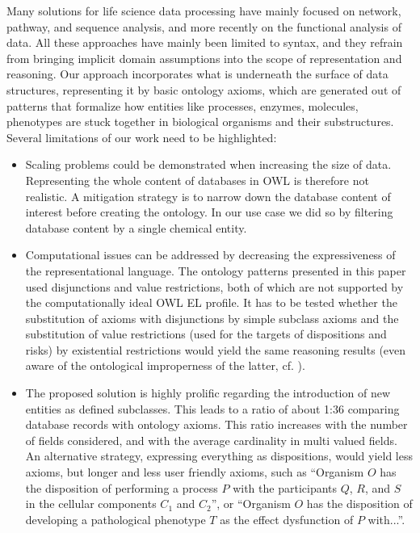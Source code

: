 Many solutions for life science data processing have mainly focused on network, pathway, and sequence analysis, and more recently on the functional analysis of data. All these approaches have mainly been limited to syntax, and they refrain from bringing implicit domain assumptions into the scope of representation and reasoning. Our approach incorporates what is underneath the surface of data structures, representing it by basic ontology axioms, which are generated out of patterns that formalize how entities like processes, enzymes, molecules, phenotypes are stuck together in biological organisms and their substructures.   
Several limitations of our work need to be highlighted: 

\begin{itemize}
	\item Scaling problems could be demonstrated when increasing the size of data. Representing the whole content of databases in OWL is therefore not realistic. A mitigation strategy is to narrow down the database content of interest before creating the ontology. In our use case we did so by filtering database content by a single chemical entity.  
	\item Computational issues can be addressed by decreasing the expressiveness of the representational language. The ontology patterns presented in this paper used disjunctions and value restrictions, both of which are not supported by the computationally ideal OWL EL profile. It has to be tested whether the substitution of axioms with disjunctions by simple subclass axioms and the substitution of value restrictions (used for the targets of dispositions and risks) by existential restrictions would yield the same reasoning results (even aware of the ontological improperness of the latter, cf. \cite{Schulz2014}).
	\item
	The proposed solution is highly prolific regarding the introduction of new entities as defined subclasses. This leads to a ratio of about 1:36 comparing database records with ontology axioms. This ratio increases with the number of fields considered, and with the average cardinality in multi valued fields. An alternative strategy, expressing everything as dispositions, would yield less axioms, but longer and less user friendly axioms, such as ``Organism $O$ has the disposition of performing a process $P$ with the participants $Q$, $R$, and $S$ in the cellular components $C_1$ and $C_2$'', or ``Organism $O$ has the disposition of developing a pathological phenotype $T$ as the effect dysfunction of $P$ with...''. 

\end{itemize}
